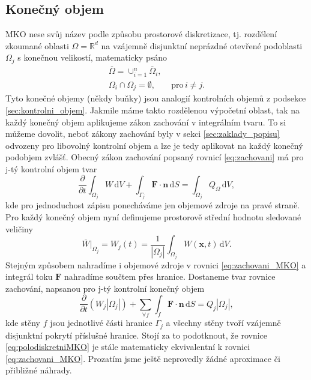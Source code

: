 \subsection{Konečný objem}
MKO nese svůj název podle způsobu prostorové diskretizace, tj. rozdělení zkoumané oblasti $\Omega=\mathbb{R}^d$ na vzájemně disjunktní neprázdné otevřené podoblasti $\Omega_j$ s konečnou velikostí, matematicky psáno
\begin{align*}
\overline{\Omega} = \cup^n_{i=1}\overline{\Omega}_i,&\\
\Omega_i \cap \Omega_j = \emptyset,& \,\,\mathrm{pro} \, i \neq j.
\end{align*}
Tyto konečné objemy (někdy buňky) jsou analogií kontrolních objemů z podsekce \ref{sec:kontrolni_objem}. Jakmile máme takto rozdělenou výpočetní oblast, tak na každý konečný objem aplikujeme zákon zachování v integrálním tvaru. To si můžeme dovolit, neboť zákony zachování byly v sekci \ref{sec:zaklady_popisu} odvozeny pro libovolný kontrolní objem a lze je tedy aplikovat na každý konečný podobjem zvlášť. Obecný zákon zachování popsaný rovnicí \ref{eq:zachovani} má pro j-tý kontrolní objem tvar
\begin{equation}\label{eq:zachovani_MKO}
\frac{\partial}{\partial t} \int_{\Omega_j}W\,\mathrm{d}V + \int_{\Gamma_j} \mathbf{F} \cdot \mathbf{n} \,\mathrm{d}S = \int_{\Omega_j}Q_\Omega \,\mathrm{d}V,
\end{equation}
kde pro jednoduchost zápisu ponecháváme jen objemové zdroje na pravé straně.
Pro každý konečný objem nyní definujeme prostorově střední hodnotu sledované veličiny 
\begin{equation*}
\overline{W}|_{\Omega_j}= W_j(t) = \frac{1}{|\Omega_j|}\int_{\Omega_j}W(\mathbf{x},t) \,\mathrm{d} V.
\end{equation*}
Stejným způsobem nahradíme i objemové zdroje v rovnici \ref{eq:zachovani_MKO} a integrál toku $\mathbf{F}$ nahradíme součtem přes hranice. Dostaneme tvar rovnice zachování, napsanou pro j-tý kontrolní konečný objem
\begin{equation}\label{eq:polodiskretniMKO}
\frac{\partial}{\partial t} (W_j|\Omega_j|) + \sum_{\forall f} \int_{f}\mathbf{F}\cdot \mathbf{n} \,\mathrm{d}S = Q_j|\Omega_j|,
\end{equation} 
kde stěny $f$ jsou jednotlivé části hranice $\Gamma_j$ a všechny stěny tvoří vzájemně disjunktní pokrytí příslušné hranice.
Stojí za to podotknout, že rovnice \ref{eq:polodiskretniMKO} je stále matematicky ekvivalentní k rovnici \ref{eq:zachovani_MKO}.
Prozatím jsme ještě neprovedly žádné aproximace či přibližné náhrady.

